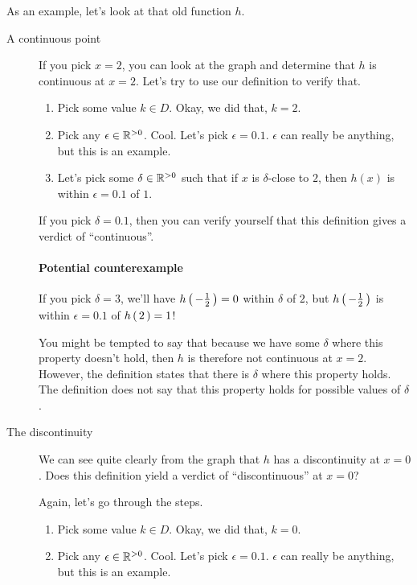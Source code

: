 \begin{example}
  As an example, let's look at that old function $h$.


  \begin{description}
  \item[A continuous point] If you pick $x = 2$, you can look at the graph and
    determine that $h$ is continuous at $x = 2$. Let's try to use our definition
    to verify that.

    \begin{enumerate}
    \item Pick some value $k \in D$. Okay, we did that, $k = 2$.
    \item Pick any $\epsilon \in \mathbb{R}^{>0}$. Cool. Let's pick $\epsilon =
      0.1$. $\epsilon$ can really be anything, but this is an example.
    \item Let's pick some $\delta \in \mathbb{R}^{>0}$ such that if $x$ is
      $\delta$-close to $2$, then $h(x)$ is within $\epsilon = 0.1$ of $1$.
    \end{enumerate}

    If you pick $\delta = 0.1$, then you can verify yourself that this
    definition gives a verdict of ``continuous''.

    \paragraph{Potential counterexample}

    If you pick $\delta = 3$, we'll have $h \left(\, -\frac{1}{2} \,\right) = 0$ within
    $\delta$ of $2$, but $h \left(\, -\frac{1}{2} \,\right)$ is  within
    $\epsilon = 0.1$ of $h \left(\, 2 \,\right) = 1$!

    You might be tempted to say that because we have some $\delta$ where this
    property doesn't hold, then $h$ is therefore not continuous at $x = 2$.
    However, the definition states that there is  $\delta$ where this
    property holds. The definition does not say that this property holds for
     possible values of $\delta$.
        
  \item[The discontinuity] We can see quite clearly from the graph that $h$ has
    a discontinuity at $x = 0$. Does this definition yield a verdict of
    ``discontinuous'' at $x = 0$?

    Again, let's go through the steps.

    \begin{enumerate}
    \item Pick some value $k \in D$. Okay, we did that, $k = 0$.
    \item Pick any $\epsilon \in \mathbb{R}^{>0}$. Cool. Let's pick $\epsilon =
      0.1$. $\epsilon$ can really be anything, but this is an example.


\end{enumerate}
\end{description}
\end{example}

